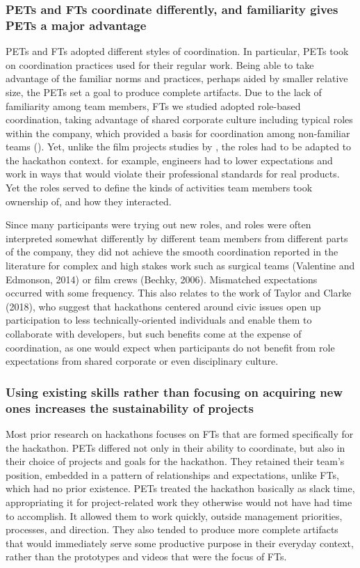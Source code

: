 \documentclass{hcij}
\begin{document}
\subsubsection{PETs and FTs coordinate differently, and familiarity gives PETs a major advantage}
PETs and FTs adopted different styles of coordination. In particular, PETs took on coordination practices used for their regular work. Being able to take advantage of the familiar norms and practices, perhaps aided by smaller relative size, the PETs set a goal to produce complete artifacts. Due to the lack of familiarity among team members, FTs we studied adopted role-based coordination, taking advantage of shared corporate culture including typical roles within the company, which provided a basis for coordination among non-familiar teams (\cite{bechky2006gaffers}). Yet, unlike the film projects studies by \citep{bechky2006gaffers}, the roles had to be adapted to the hackathon context. for example, engineers had to lower expectations and work in ways that would violate their professional standards for real products. Yet the roles served to define the kinds of activities team members took ownership of, and how they interacted.

Since many participants were trying out new roles, and roles were often interpreted somewhat differently by different team members from different parts of the company, they did not achieve the smooth coordination reported in the literature for complex and high stakes work such as surgical teams (Valentine and Edmonson, 2014) or film crews (Bechky, 2006). Mismatched expectations occurred with some frequency. This also relates to the work of Taylor and Clarke (2018), who suggest that hackathons centered around civic issues open up participation to less technically-oriented individuals and enable them to collaborate with developers, but such benefits come at the expense of coordination, as one would expect when participants do not benefit from role expectations from shared corporate or even disciplinary culture.

\subsubsection{Using existing skills rather than focusing on acquiring new ones increases the
sustainability of projects}
Most prior research on hackathons focuses on FTs that are formed specifically for the hackathon. PETs differed not only in their ability to coordinate, but also in their choice of projects and goals for the hackathon. They retained their team’s position, embedded in a pattern of relationships and expectations, unlike FTs, which had no prior existence. PETs treated the hackathon basically as slack time, appropriating it for project-related work they otherwise would not have had time to accomplish. It allowed them to work quickly, outside management priorities, processes, and direction. They also tended to produce more complete artifacts that would immediately serve some productive purpose in their everyday context, rather than the prototypes and videos that were the focus of FTs.
\end{document}
